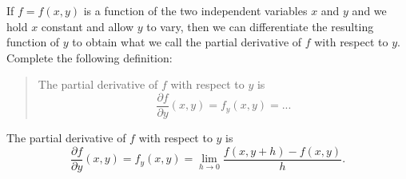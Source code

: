  \begin{activity} \label{A:10.2.1} If $f = f(x,y)$ is a function of the two independent variables $x$ and $y$ and we hold $x$ constant and allow $y$ to vary, then we can differentiate the resulting function of $y$ to obtain what we call the partial derivative of $f$ with respect to $y$. Complete the following definition:

\begin{quote} The partial derivative of $f$ with respect to $y$ is
\[\frac{\partial f}{\partial y}(x,y) = f_y(x,y) = ...\]
\end{quote}



\end{activity}
\begin{smallhint}

\end{smallhint}
\begin{bighint}

\end{bighint}
\begin{activitySolution}
The partial derivative of $f$ with respect to $y$ is
\[\frac{\partial f}{\partial y}(x,y) = f_y(x,y) = \lim_{h \to 0} \frac{f(x,y+h)-f(x,y)}{h}.\]
\end{activitySolution}
\aftera
